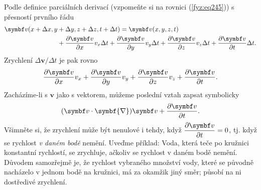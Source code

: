     Podle definice parciálních derivací (vzpomeňte si na rovnici (\ref{fyz:eq245})) s přesností 
    prvního řádu
    \begin{align*}
      \bm{v}(x+ \Delta x, y 
        &+ \Delta y, z + \Delta z, t + \Delta t) 
         = \bm{v}(x, y, z, t)                                                                \\
        &+ \pder{\bm{v}}{x}v_x\Delta t + \pder{\bm{v}}{y}v_y\Delta t + \pder{\bm{v}}{z}v_z\Delta t
         + \pder{\bm{v}}{t}\Delta t.
    \end{align*}
    Zrychlení \(\Delta{\bm{v}}/\Delta{t}\) je pak rovno
    \begin{equation*}
      \pder{\bm{v}}{x}v_x + \pder{\bm{v}}{y}v_y + \pder{\bm{v}}{z}v_z + \pder{\bm{v}}{t}.
    \end{equation*}
    Zacházíme-li s \(\bm{v}\) jako s vektorem, můžeme poslední vztah zapsat symbolicky
    \begin{equation}\label{fyz:eq550}
      (\bm{v}\cdot\symbf{\nabla})\bm{v} + \pder{\bm{v}}{t}.
    \end{equation}
    Všimněte si, že zrychlení může být nenulové i tehdy, když \(\pder{\bm{v}}{t} = 0\), tj. když se 
    rychlost \emph{v daném bodě} nemění. Uveďme příklad: Voda, která teče po kružnici konstantní 
    rychlostí, se zrychluje, ačkoliv se rychlost v daném bodě nemění. Důvodem samozřejmě je, že 
    rychlost vybraného množství vody, které se původně nacházelo v jednom bodě na kružnici, má za 
    okamžik jiný směr; působí na ni dostředivé zrychlení. 
    
